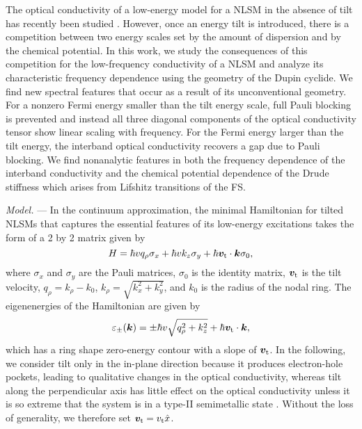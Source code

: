 \documentclass[aps,twocolumn,floatfix]{revtex4-1}
\begin{document}
The optical conductivity of a low-energy model for a NLSM in the absence of tilt has recently been studied \cite{Carbotte2017}. However, once an energy tilt is introduced, there is a competition between two energy scales set by the amount of dispersion and by the chemical potential.
In this work, we study the consequences of this competition for the low-frequency conductivity of a NLSM and analyze its characteristic frequency dependence using the geometry of the Dupin cyclide. We find new spectral features that occur as a result of its unconventional geometry. For a nonzero Fermi energy smaller than the tilt energy scale, full Pauli blocking is prevented and instead all three diagonal components of the optical conductivity tensor show linear scaling with frequency. For the Fermi energy larger than the tilt energy, the interband optical conductivity recovers a gap due to Pauli blocking. We find nonanalytic features in both the frequency dependence of the interband conductivity and the chemical potential dependence of the Drude stiffness which arises from Lifshitz transitions of the FS.


{\em Model.} --- In the continuum approximation, the minimal Hamiltonian for tilted NLSMs that captures the essential features of its low-energy excitations takes the form of a 2 by 2 matrix given by
\cite{Mullen2015,Fang2015}
\begin{equation}\label{eq:hamiltonian_2band}
H=\hbar v q_\rho \sigma_x +\hbar v k_z \sigma_y + \hbar \bm{v}_{\rm t}\cdot\bm{k}\sigma_0,
\end{equation}
where $\sigma_x$ and $\sigma_y$ are the Pauli matrices, $\sigma_0$ is the identity matrix, $\bm{v}_{\rm t}$ is the tilt velocity, $q_{\rho}=k_{\rho}-k_0$, $k_{\rho}=\sqrt{k_x^2+k_y^2}$, and $k_0$ is the radius of the nodal ring.
The eigenenergies of the Hamiltonian are given by
\begin{equation}
\varepsilon_{\pm}(\bm{k})=\pm \hbar v\sqrt{q_{\rho}^2 + k_z^2} + \hbar \bm{v}_{\rm t}\cdot \bm{k},
\end{equation}
which has a ring shape zero-energy contour with a slope of $\bm{v}_{\rm t}$.
In the following, we consider tilt only in the in-plane direction because it produces electron-hole pockets, leading to qualitative changes in the optical conductivity, whereas tilt along the perpendicular axis has little effect on the optical conductivity unless it is so extreme that the system is in a type-II semimetallic state \cite{supplemental}. Without the loss of generality, we therefore set
$\bm{v}_{\rm t}=v_{\rm t} \hat{x}$.
\end{document}
